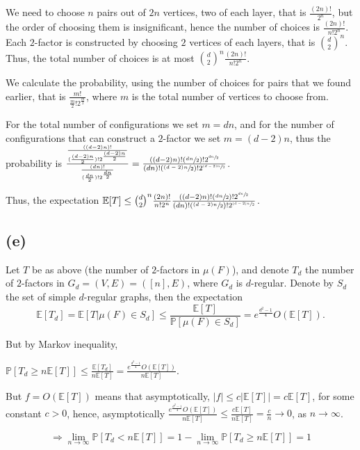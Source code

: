 \documentclass{article}
\begin{document}
We need to choose $n$ pairs out of $2n$ vertices, two of each layer, that is $\frac{(2n)!}{2^n}$, but the order of choosing them is insignificant, hence the number of choices is $\frac{(2n)!}{n!2^n}$.
Each $2$-factor is constructed by choosing $2$ vertices of each layers, that is $\binom{d}{2}^n$. Thus, the total number of choices is at most $\binom{d}{2}^n\frac{(2n)!}{n!2^n}$.

We calculate the probability, using the number of choices for pairs that we found earlier, that is $\frac{m!}{\frac{m}{2}!2^{\frac{m}{2}}}$, where $m$ is the total number of vertices to choose from.

For the total number of configurations we set $m=dn$, and for the number of configurations that can construct a $2$-factor we set $m=(d-2)n$, thus the probability is $
\frac{\frac{((d-2)n)!}{(\frac{(d-2)n}{2})!2^{\frac{(d-2)n}{2}}}}{\frac{(dn)!}{(\frac{dn}{2})!2^{\frac{dn}{2}}}}=\frac{((d-2)n)!(\sfrac{dn}{2})!2^{\sfrac{dn}{2}}}{(dn)!(\sfrac{(d-2)n}{2})!2^{\sfrac{(d-2)n}{2}}}$.

Thus, the expectation $\mathbb{E}[T]\leq\binom{d}{2}^n\frac{(2n)!}{n!2^n}\frac{((d-2)n)!(\sfrac{dn}{2})!2^{\sfrac{dn}{2}}}{(dn)!(\sfrac{(d-2)n}{2})!2^{\sfrac{(d-2)n}{2}}}$.

\subsection*{(e)}
Let $T$ be as above (the number of $2$-factors in $\mu(F)$), and denote $T_d$ the number of $2$-factors in $G_d=(V,E)=([n],E)$, where $G_d$ is $d$-regular. Denote by $S_d$ the set of simple $d$-regular graphs, then the expectation 
\[\mathbb{E}[T_d]=\mathbb{E}[T|\mu(F)\in{S_d}]\leq\frac{\mathbb{E}[T]}{\mathbb{P}[\mu(F)\in{S_d}]}=e^{\frac{d^2-1}{4}}O(\mathbb{E}[T]).\]

But by Markov inequality,

$\mathbb{P}[T_d\geq{n\mathbb{E}[T]}]\leq\frac{\mathbb{E}[T_d]}{n\mathbb{E}[T]}=\frac{e^{\frac{d^2-1}{4}}O(\mathbb{E}[T])}{n\mathbb{E}[T]}$.

But $f=O(\mathbb{E}[T])$ means that asymptotically, $|f|\leq{c|\mathbb{E}[T]|}=c\mathbb{E}[T]$, for some constant $c>0$, hence, asymptotically $\frac{e^{\frac{d^2-1}{4}}O(\mathbb{E}[T])}{n\mathbb{E}[T]}\leq\frac{c\mathbb{E}[T]}{n\mathbb{E}[T]}=\frac{c}{n}\rightarrow{0}$, as $n\rightarrow\infty$.

\[
\Rightarrow\lim_{n\rightarrow\infty}\mathbb{P}[T_d<n\mathbb{E}[T]]=1-\lim_{n\rightarrow\infty}\mathbb{P}[T_d\geq{n\mathbb{E}[T]}]=1
\]
\end{document}
